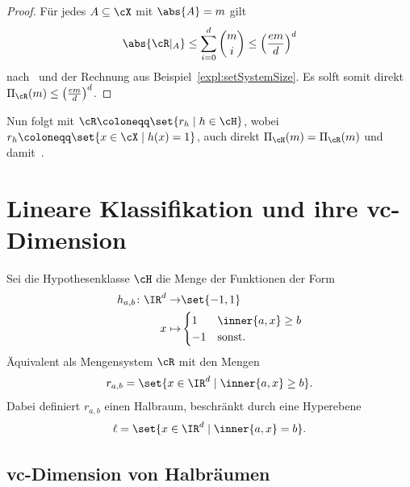 \documentclass[language=ngerman,algolist,acrolist]{TemplateLecture}
\begin{document}
\begin{proof}
    Für jedes $A \subseteq \cX$ mit $\abs{A} = m$ gilt 
    \begin{equation*}
        \abs{\cR|_A} \leq \sum_{i = 0}^d \binom{m}{i} \leq \left( \frac{em}{d} \right)^d
    \end{equation*}
    nach~ und der Rechnung aus Beispiel~\ref{expl:setSystemSize}. Es solft somit direkt $\Pi_\cR(m) \leq \left( \frac{em}{d} \right)^d$. 
\end{proof}

Nun folgt mit $\cR \coloneqq \set{r_h \mid h \in \cH}$, wobei $r_h \coloneqq \set{x \in \cX \mid h(x) = 1}$, auch direkt $\Pi_\cH(m) = \Pi_\cR(m)$ und damit~.



\chapter{Lineare Klassifikation und ihre \acs{vc}-Dimension}

Sei die Hypothesenklasse $\cH$ die Menge der Funktionen der Form 
\begin{equation*}
    \begin{split}
        h_{a, b} \colon \IR^d \to& \set{-1,1} \\
            x \mapsto& \begin{cases}
                1 & \inner{a, x} \geq b \\ 
                -1 & \text{sonst}.
            \end{cases}
    \end{split}
\end{equation*}
Äquivalent als Mengensystem $\cR$ mit den Mengen 
\begin{equation*}
    r_{a, b} = \set{x \in \IR^d \mid \inner{a, x} \geq b}.
\end{equation*}
Dabei definiert $r_{a, b}$ einen Halbraum, beschränkt durch eine Hyperebene 
\begin{equation*}
    \ell = \set{x \in \IR^d \mid \inner{a,x} = b}.
\end{equation*}

\section{\acs{vc}-Dimension von Halbräumen}
\end{document}
